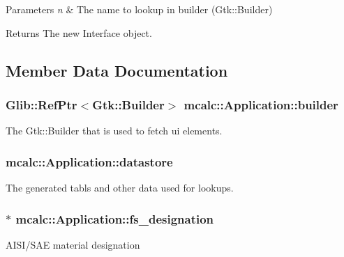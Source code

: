 \begin{DoxyParams}{Parameters}
{\em n} & The name to lookup in builder (Gtk\+::\+Builder) \\
\hline
\end{DoxyParams}
\begin{DoxyReturn}{Returns}
The new Interface object. 
\end{DoxyReturn}


\subsection{Member Data Documentation}
\subsubsection[{\texorpdfstring{builder}{builder}}]{\setlength{\rightskip}{0pt plus 5cm}Glib\+::\+Ref\+Ptr$<$Gtk\+::\+Builder$>$ mcalc\+::\+Application\+::builder\hspace{0.3cm}{\ttfamily [protected]}}\hypertarget{classmcalc_1_1Application_ae877f6c9210ec88c743a54f750a54892}{}\label{classmcalc_1_1Application_ae877f6c9210ec88c743a54f750a54892}
The Gtk\+::\+Builder that is used to fetch ui elements. 
\subsubsection[{\texorpdfstring{datastore}{datastore}}]{ mcalc\+::\+Application\+::datastore\hspace{0.3cm}{\ttfamily [protected]}}\hypertarget{classmcalc_1_1Application_a2fa9d06d424a8def5ea70fa07e844b9c}{}\label{classmcalc_1_1Application_a2fa9d06d424a8def5ea70fa07e844b9c}
The generated tabls and other data used for lookups. 
\subsubsection[{\texorpdfstring{fs\+\_\+designation}{fs_designation}}]{$\ast$ mcalc\+::\+Application\+::fs\+\_\+designation\hspace{0.3cm}{\ttfamily [protected]}}\hypertarget{classmcalc_1_1Application_a5dd81c68d005acedeb18336bfe87cdcb}{}\label{classmcalc_1_1Application_a5dd81c68d005acedeb18336bfe87cdcb}
A\+I\+S\+I/\+S\+AE material designation 
